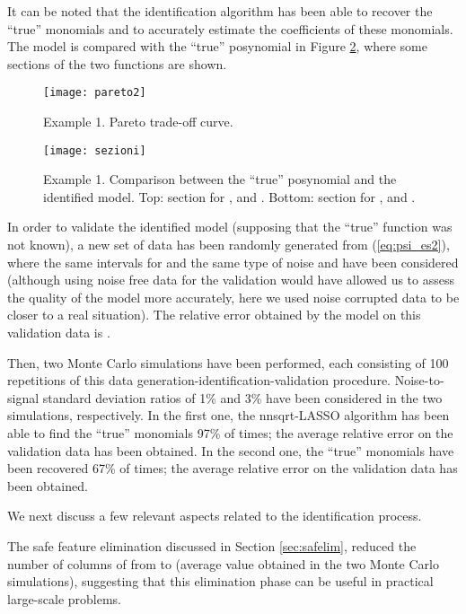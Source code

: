 \documentclass[11pt]{article}
\begin{document}
It can be noted that the identification algorithm has been able to
recover the ``true'' monomials and to accurately estimate the coefficients
of these monomials. The model is compared with the ``true'' posynomial
in Figure \ref{sezioni}, where some sections of the two functions
are shown.

\begin{figure}
\centering\texttt{[image: pareto2]}

\caption{Example 1. Pareto trade-off curve.\label{pareto:figure}}
\end{figure}


\begin{figure}
\centering\texttt{[image: sezioni]}

\caption{Example 1. Comparison between the ``true'' posynomial and the identified
model. Top: section for ,  and .
Bottom: section for ,  and .
\label{sezioni}}


\end{figure}


In order to validate the identified model (supposing that the ``true''
function was not known), a new set of  data has been randomly
generated from (\ref{eq:psi_es2}), where 
the same intervals for  and the same type of noise and have been considered (although using noise free data for the validation would have allowed
us to assess the quality of the model more accurately, here we used
noise corrupted data to be closer to a real situation). The relative
error obtained by the model on this validation data is .

Then, two Monte Carlo simulations have been performed, each consisting
of 100 repetitions of this data generation-identification-validation
procedure. Noise-to-signal standard deviation ratios of 1\% and 3\%
have been considered in the two simulations, respectively. In the
first one, the nnsqrt-LASSO algorithm has been able to find the ``true''
monomials 97\% of times; the average relative error 
on the validation data has been obtained. In the second one, the ``true''
monomials have been recovered 67\% of times; the average relative
error  on the validation data has been obtained.

We next discuss a few relevant aspects related to the identification
process.

The safe feature elimination discussed in Section \ref{sec:safelim},
reduced the number of columns of  from  to  (average
value obtained in the two Monte Carlo simulations), suggesting that
this elimination phase can be useful in practical large-scale problems.
\end{document}
